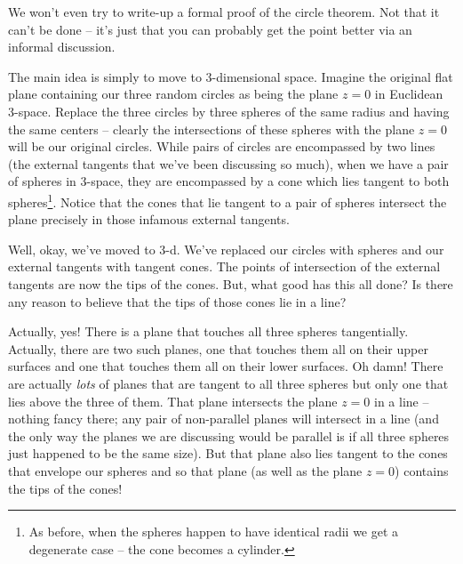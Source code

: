 We won't even try to write-up a formal proof of the circle theorem.
Not that it can't be done -- it's just that you can probably get the
point better via an informal discussion.

The main idea is simply to move to 3-dimensional space.  Imagine the
original flat plane containing our three random circles as being the
plane $z=0$ in Euclidean 3-space.  Replace the three circles by three
spheres of the same radius and having the same centers -- clearly the 
intersections of these spheres with the plane $z=0$ will be our original
circles.  While pairs of circles are encompassed by two lines (the external
tangents that we've been discussing so much), when we have a pair of spheres
in 3-space, they are encompassed by a cone which lies tangent to both
spheres\footnote{As before, when the spheres happen to have identical radii %
we get a degenerate case -- the cone becomes a cylinder.}.  Notice that 
the cones that lie tangent to a pair of spheres intersect the plane
precisely in those infamous external tangents.

Well, okay, we've moved to 3-d.  We've replaced our circles with spheres
and our external tangents with tangent cones.  The points of intersection
of the external tangents are now the tips of the cones.  But, what good has this all done?
Is there any reason to believe that the tips of those cones lie in a line?

Actually, yes!  There is a plane that touches all three spheres tangentially.
Actually, there are two such planes, one that touches them all on their
upper surfaces and one that touches them all on their lower surfaces.  Oh 
damn!  There are actually \emph{lots} of planes that are tangent to all three spheres
but only one that lies above the three of them.  That plane intersects the
plane $z=0$ in a line -- nothing fancy there; any pair of non-parallel planes
will intersect in a line (and the only way the planes we are discussing
would be parallel is if all three spheres just happened to be the same size).
But that plane also lies tangent to the cones that envelope our spheres
and so that plane (as well as the plane $z=0$) contains the tips of the
cones!

\clearpage

\rule{0pt}{0pt}

\vfill

